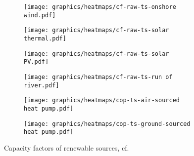 \clearpage
\onecolumn
\begin{figure}
    \centering
        \begin{subfigure}[t]{0.49\textwidth}
            \centering
        \texttt{[image: graphics/heatmaps/cf-raw-ts-onshore wind.pdf]}
    \end{subfigure}
    \begin{subfigure}[t]{0.49\textwidth}
        \centering
        \texttt{[image: graphics/heatmaps/cf-raw-ts-solar thermal.pdf]}
    \end{subfigure}
    \begin{subfigure}[t]{0.49\textwidth}
        \centering
        \texttt{[image: graphics/heatmaps/cf-raw-ts-solar PV.pdf]}
    \end{subfigure}
    \begin{subfigure}[t]{0.49\textwidth}
        \centering
        \texttt{[image: graphics/heatmaps/cf-raw-ts-run of river.pdf]}
    \end{subfigure}
    \begin{subfigure}[t]{0.49\textwidth}
        \centering
        \texttt{[image: graphics/heatmaps/cop-ts-air-sourced heat pump.pdf]}
    \end{subfigure}
    \begin{subfigure}[t]{0.49\textwidth}
        \centering
        \texttt{[image: graphics/heatmaps/cop-ts-ground-sourced heat pump.pdf]}
    \end{subfigure}
    \caption{Capacity factors of renewable sources, cf. \cite{Neumann2022}}
    \label{fig:ren-cfs}
\end{figure}
\clearpage
\twocolumn
